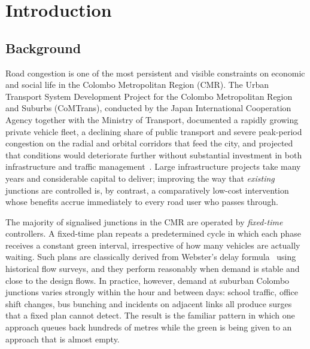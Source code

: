\chapter{Introduction}\label{ch:intro}

\section{Background}\label{sec:intro-background}

Road congestion is one of the most persistent and visible constraints on economic and social life in the Colombo Metropolitan Region (CMR). The Urban Transport System Development Project for the Colombo Metropolitan Region and Suburbs (CoMTrans), conducted by the Japan International Cooperation Agency together with the Ministry of Transport, documented a rapidly growing private vehicle fleet, a declining share of public transport and severe peak-period congestion on the radial and orbital corridors that feed the city, and projected that conditions would deteriorate further without substantial investment in both infrastructure and traffic management~\cite{jica2014comtrans}. Large infrastructure projects take many years and considerable capital to deliver; improving the way that \emph{existing} junctions are controlled is, by contrast, a comparatively low-cost intervention whose benefits accrue immediately to every road user who passes through.

The majority of signalised junctions in the CMR are operated by \emph{fixed-time} controllers. A fixed-time plan repeats a predetermined cycle in which each phase receives a constant green interval, irrespective of how many vehicles are actually waiting. Such plans are classically derived from Webster's delay formula~\cite{webster1958} using historical flow surveys, and they perform reasonably when demand is stable and close to the design flows. In practice, however, demand at suburban Colombo junctions varies strongly within the hour and between days: school traffic, office shift changes, bus bunching and incidents on adjacent links all produce surges that a fixed plan cannot detect. The result is the familiar pattern in which one approach queues back hundreds of metres while the green is being given to an approach that is almost empty.

